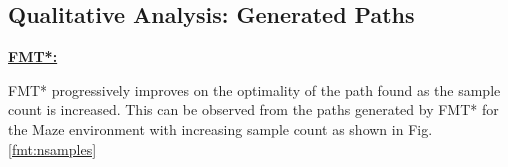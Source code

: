 \documentclass{article}
\begin{document}
\subsection{Qualitative Analysis: Generated Paths}

\textbf{\underline{FMT*:}}

FMT* progressively improves on the optimality of the path found as the sample count is increased. This can be observed from the paths generated by FMT* for the Maze environment with increasing sample count as shown in Fig. \ref{fmt:nsamples}

\begin{figure}
\end{figure}
\end{document}
